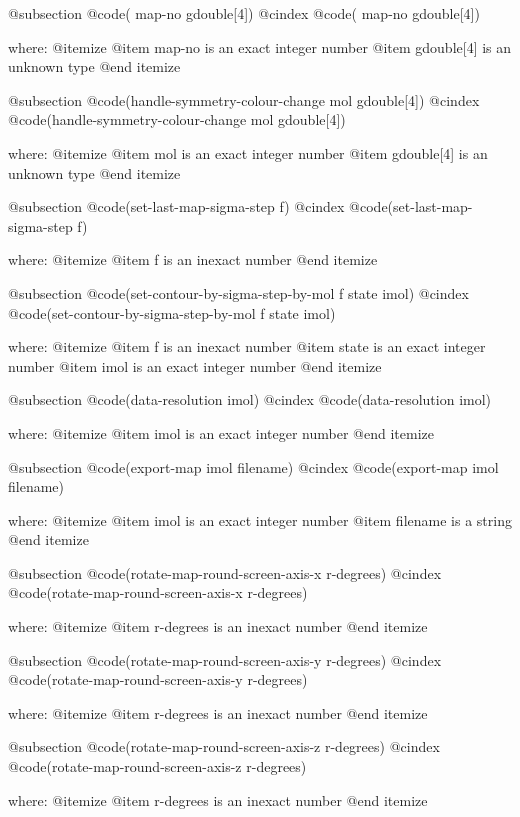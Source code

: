 @subsection @code{( map-no gdouble[4])}
@cindex @code{( map-no gdouble[4])}
 
where: 
 @itemize 
     @item map-no is an exact integer number
     @item gdouble[4] is an unknown type
 @end itemize


@subsection @code{(handle-symmetry-colour-change mol gdouble[4])}
@cindex @code{(handle-symmetry-colour-change mol gdouble[4])}
 
where: 
 @itemize 
     @item mol is an exact integer number
     @item gdouble[4] is an unknown type
 @end itemize


@subsection @code{(set-last-map-sigma-step f)}
@cindex @code{(set-last-map-sigma-step f)}
 
where: 
 @itemize 
     @item f is an inexact number
 @end itemize


@subsection @code{(set-contour-by-sigma-step-by-mol f state imol)}
@cindex @code{(set-contour-by-sigma-step-by-mol f state imol)}
 
where: 
 @itemize 
     @item f is an inexact number
     @item state is an exact integer number
     @item imol is an exact integer number
 @end itemize


@subsection @code{(data-resolution imol)}
@cindex @code{(data-resolution imol)}
 
where: 
 @itemize 
     @item imol is an exact integer number
 @end itemize


@subsection @code{(export-map imol filename)}
@cindex @code{(export-map imol filename)}
 
where: 
 @itemize 
     @item imol is an exact integer number
     @item filename is a string
 @end itemize


@subsection @code{(rotate-map-round-screen-axis-x r-degrees)}
@cindex @code{(rotate-map-round-screen-axis-x r-degrees)}
 
where: 
 @itemize 
     @item r-degrees is an inexact number
 @end itemize


@subsection @code{(rotate-map-round-screen-axis-y r-degrees)}
@cindex @code{(rotate-map-round-screen-axis-y r-degrees)}
 
where: 
 @itemize 
     @item r-degrees is an inexact number
 @end itemize


@subsection @code{(rotate-map-round-screen-axis-z r-degrees)}
@cindex @code{(rotate-map-round-screen-axis-z r-degrees)}
 
where: 
 @itemize 
     @item r-degrees is an inexact number
 @end itemize



